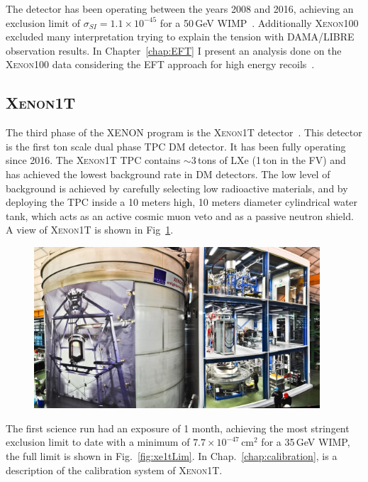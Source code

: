 The detector has been operating between the years 2008 and 2016, achieving an exclusion limit of $\sigma_{SI} = 1.1 \times 10^{-45}$ for a 50\,GeV WIMP~\cite{xe100_run_combination}. Additionally \textsc{Xenon100} excluded many interpretation trying to explain the tension with DAMA/LIBRE observation results. In Chapter~\ref{chap:EFT} I present an analysis done on the \textsc{Xenon100} data considering the EFT approach for high energy recoils~\cite{Aprile:2017aas}.  

\subsection{\textsc{Xenon1T}}
\label{sec:xe1T}

The third phase of the XENON program is the \textsc{Xenon1T} detector~\cite{Aprile:2017aty}. This detector is the first ton scale dual phase TPC  DM detector. It has been fully operating since 2016. The \textsc{Xenon1T} TPC contains $\sim 3$\,tons of LXe (1\,ton in the FV) and has achieved the lowest background rate in DM detectors. The low level of background is achieved by carefully selecting low radioactive materials, and by deploying the TPC inside a 10 meters high, 10 meters diameter cylindrical water tank, which acts as an active cosmic muon veto and as a passive neutron shield. A view of \textsc{Xenon1T} is shown in Fig~\ref{fig:xe1tpic}.

\begin{figure}[]
	\centering
	\includegraphics[width=0.95\textwidth]{figs/xe1tImg.png}
	\label{fig:xe1tpic}
\end{figure}

The first science run had an exposure of 1 month, achieving the most stringent  exclusion limit to date with a minimum of $7.7\times10^{-47}$\,cm$^2$ for a 35\,GeV WIMP, the full limit is shown in Fig.~\ref{fig:xe1tLim}. In Chap.~\ref{chap:calibration}, is a description of the calibration system of \textsc{Xenon1T}.
 
